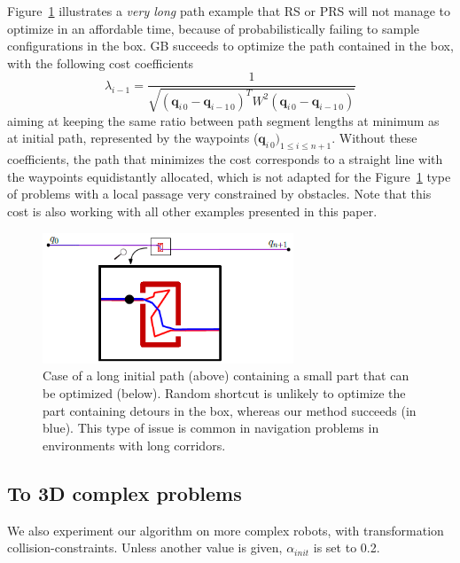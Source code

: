 \documentclass{tADR2e}
\newcommand\conf{\mathbf{q}}
\newcommand\weight{W}
\begin{document}
Figure~\ref{local_box_optim} illustrates a \textit{very long} path example that RS or PRS will not manage to 
optimize in an affordable time, because of probabilistically failing to sample 
configurations in the box. GB succeeds to optimize the 
path contained in the box, with the following cost coefficients 
$$
\lambda_{i-1} = \frac{1}{\sqrt{(\conf_{i\,0}-\conf_{i-1\,0})^T \weight^2 
(\conf_{i\,0}-\conf_{i-1\,0})}}
$$
aiming at keeping the same ratio between path segment lengths at 
minimum as at 
initial path, represented by the waypoints ($\conf_{i\,0})_{1\leq i\leq n+1}$.
Without these coefficients, the path that minimizes the cost corresponds to a 
straight line with the waypoints equidistantly allocated, which is not adapted for 
the Figure~\ref{local_box_optim} type of problems with a local passage very
constrained by obstacles. Note that this cost is also working with all other 
examples presented in this paper.


\begin{figure}[t]
	\centering
	\includegraphics[width=7.5cm]{local_box_optim.png}
	\caption{Case of a long initial path (above) containing a small part that can 
	be optimized (below). Random shortcut is unlikely to optimize the part 
	containing detours in the box, whereas our method 
	succeeds (in blue). This type of issue is common in navigation problems in 
	environments with long corridors.}
	\label{local_box_optim}
\end{figure}



\subsection{To 3D complex problems}

We also experiment our algorithm on more complex robots, with transformation 
collision-constraints. Unless another value is given, $\alpha_{init}$ is set to 0.2.

\end{document}
